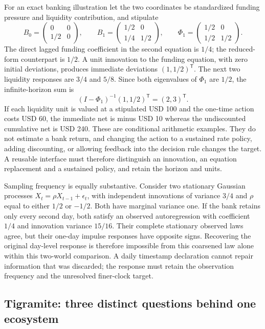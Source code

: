 For an exact banking illustration let the two coordinates be standardized
funding pressure and liquidity contribution, and stipulate
\[
 B_0=\begin{pmatrix}0&0\\1/2&0\end{pmatrix},\qquad
 B_1=\begin{pmatrix}1/2&0\\1/4&1/2\end{pmatrix},\qquad
 \Phi_1=\begin{pmatrix}1/2&0\\1/2&1/2\end{pmatrix}.
\]
The direct lagged funding coefficient in the second equation is $1/4$;
the reduced-form counterpart is $1/2$. A unit innovation to the funding
equation, with zero initial deviations, produces immediate deviations
$(1,1/2)^\mathsf{T}$. The next two liquidity responses are $3/4$ and $5/8$.
Since both eigenvalues of $\Phi_1$ are $1/2$, the infinite-horizon sum is
\[
 (I-\Phi_1)^{-1}(1,1/2)^\mathsf{T}=(2,3)^\mathsf{T}.
\]
If each liquidity unit is valued at a stipulated USD 100 and the one-time
action costs USD 60, the immediate net is minus USD 10 whereas the undiscounted
cumulative net is USD 240. These are conditional arithmetic examples. They
do not estimate a bank return, and changing the action to a sustained rate
policy, adding discounting, or allowing feedback into the decision rule
changes the target. A reusable interface must therefore distinguish an
innovation, an equation replacement and a sustained policy, and retain the
horizon and units. \citep{exec14_pt_exact}

Sampling frequency is equally substantive. Consider two stationary Gaussian
processes $X_t=\rho X_{t-1}+\epsilon_t$, with independent innovations of
variance $3/4$ and $\rho$ equal to either $1/2$ or $-1/2$. Both have marginal
variance one. If the bank retains only every second day, both satisfy an
observed autoregression with coefficient $1/4$ and innovation variance
$15/16$. Their complete stationary observed laws agree, but their one-day
impulse responses have opposite signs. Recovering the original day-level
response is therefore impossible from this coarsened law alone within this
two-world comparison. A daily timestamp declaration cannot repair information
that was discarded; the response must retain the observation frequency and
the unresolved finer-clock target. \citep{exec14_pt_exact}

\subsection{Tigramite: three distinct questions behind one ecosystem}

